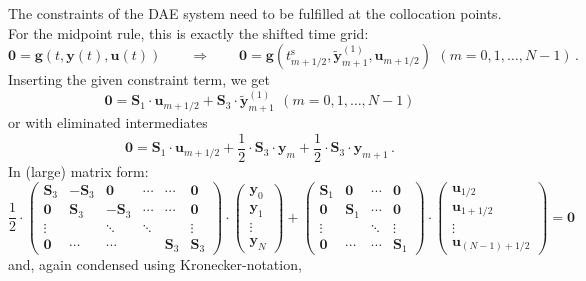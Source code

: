 \documentclass{article}
\newcommand{\vectorfont}[1]{\boldsymbol{#1}}%
\newcommand{\greekvectorfont}[1]{\boldsymbol{#1}}%
\newcommand{\matrixfont}[1]{\mathbf{#1}}%
\newcommand{\gvec}{\vectorfont{g}}
\newcommand{\uvec}{\vectorfont{u}}
\newcommand{\yvec}{\vectorfont{y}}
\newcommand{\tildeyvec}{\vectorfont{\tilde{y}}}
\newcommand{\nullvec}{\greekvectorfont{0}}
\newcommand{\Smat}{\matrixfont{S}}
\newcommand{\Nullmat}{\matrixfont{0}}
\begin{document}
The constraints of the DAE system need to be fulfilled at the collocation points.
For the midpoint rule, this is exactly the shifted time grid:
\[
\nullvec = \gvec (t, \yvec(t), \uvec(t))
\qquad \Rightarrow\qquad
\nullvec = \gvec(t_{m+1/2}^{\mathrm{s}}, \tildeyvec_{m+1}^{(1)}, \uvec_{m+1/2})\,~(m = 0,1,\ldots,N-1)\,.
\]
Inserting the given constraint term, we get
\[
\nullvec = \Smat_1 \cdot \uvec_{m+1/2} + \Smat_3 \cdot \tildeyvec_{m+1}^{(1)}\,~(m = 0,1,\ldots,N-1)
\]
or with eliminated intermediates
\[
\nullvec = \Smat_1 \cdot \uvec_{m+1/2} + \frac{1}{2}\cdot \Smat_3 \cdot \yvec_m + \frac{1}{2}\cdot \Smat_3 \cdot \yvec_{m+1}\,.
\]
In (large) matrix form:
\[
\frac{1}{2}\cdot 
\begin{pmatrix}
	\Smat_3  & -\Smat_3 & \Nullmat & \cdots & \cdots  & \Nullmat \\
	\Nullmat & \Smat_3  & -\Smat_3 & \cdots & \cdots  & \Nullmat \\
	\vdots   &          & \ddots   & \ddots &         & \vdots   \\
	\Nullmat & \cdots   & \cdots   &        & \Smat_3 & \Smat_3
\end{pmatrix}
\cdot 
\begin{pmatrix}
	\yvec_0 \\ \yvec_1 \\ \vdots \\ \yvec_N
\end{pmatrix}
+
\begin{pmatrix}
	\Smat_1  & \Nullmat & \cdots & \Nullmat \\
	\Nullmat & \Smat_1  & \cdots & \Nullmat \\
	\vdots   &          & \ddots & \vdots   \\
	\Nullmat & \cdots   & \cdots & \Smat_1
\end{pmatrix}
\cdot 
\begin{pmatrix}
	\uvec_{1/2} \\ \uvec_{1+1/2} \\ \vdots \\ \uvec_{(N-1)+1/2}
\end{pmatrix}
= \nullvec
\]
and, again condensed using Kronecker-notation,
\end{document}
